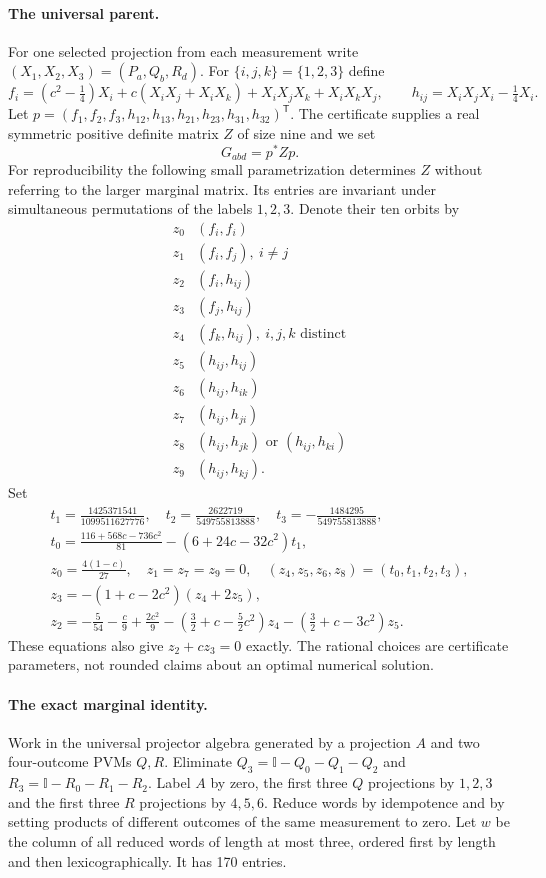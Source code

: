 \documentclass[11pt]{article}
\newcommand{\Id}{\mathbb I}
\begin{document}
\paragraph{The universal parent.}
For one selected projection from each measurement write $(X_1,X_2,X_3)=(P_a,Q_b,R_d)$. For $\{i,j,k\}=\{1,2,3\}$ define
\[
 f_i=(c^2-\tfrac14)X_i+c(X_iX_j+X_iX_k)+X_iX_jX_k+X_iX_kX_j,
 \qquad h_{ij}=X_iX_jX_i-\tfrac14X_i.
\]
Let $p=(f_1,f_2,f_3,h_{12},h_{13},h_{21},h_{23},h_{31},h_{32})^\mathsf T$.
The certificate supplies a real symmetric positive definite matrix $Z$ of size nine and we set
\[
             G_{abd}=p^*Zp.
\]
For reproducibility the following small parametrization determines $Z$ without referring to the larger marginal matrix. Its entries are invariant under simultaneous permutations of the labels $1,2,3$. Denote their ten orbits by
\[
\begin{array}{c|l}
 z_0&(f_i,f_i)\\
 z_1&(f_i,f_j),\ i\ne j\\
 z_2&(f_i,h_{ij})\\
 z_3&(f_j,h_{ij})\\
 z_4&(f_k,h_{ij}),\ i,j,k\text{ distinct}\\
 z_5&(h_{ij},h_{ij})\\
 z_6&(h_{ij},h_{ik})\\
 z_7&(h_{ij},h_{ji})\\
 z_8&(h_{ij},h_{jk})\text{ or }(h_{ij},h_{ki})\\
 z_9&(h_{ij},h_{kj}).
\end{array}
\]
Set
\[
\begin{gathered}
 t_1=\frac{1425371541}{1099511627776},\quad
 t_2=\frac{2622719}{549755813888},\quad
 t_3=-\frac{1484295}{549755813888},\\
 t_0=\frac{116+568c-736c^2}{81}-(6+24c-32c^2)t_1,\\
 z_0=\frac{4(1-c)}{27},\quad z_1=z_7=z_9=0,\quad
 (z_4,z_5,z_6,z_8)=(t_0,t_1,t_2,t_3),\\
 z_3=-(1+c-2c^2)(z_4+2z_5),\\
 z_2=-\frac5{54}-\frac c9+\frac{2c^2}9
       -(\tfrac32+c-\tfrac52c^2)z_4
       -(\tfrac32+c-3c^2)z_5.
\end{gathered}
\]
These equations also give $z_2+cz_3=0$ exactly. The rational choices are certificate parameters, not rounded claims about an optimal numerical solution.

\paragraph{The exact marginal identity.}
Work in the universal projector algebra generated by a projection $A$ and two four-outcome PVMs $Q,R$. Eliminate $Q_3=\Id-Q_0-Q_1-Q_2$ and $R_3=\Id-R_0-R_1-R_2$. Label $A$ by zero, the first three $Q$ projections by $1,2,3$ and the first three $R$ projections by $4,5,6$. Reduce words by idempotence and by setting products of different outcomes of the same measurement to zero. Let $w$ be the column of all reduced words of length at most three, ordered first by length and then lexicographically. It has 170 entries.
\end{document}
